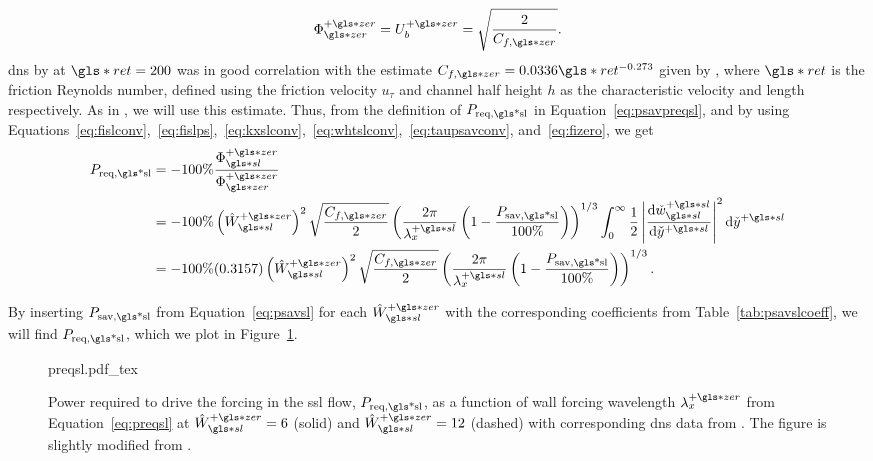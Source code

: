 \begin{equation}
	\Phi\pz\zz=U_b\pz=\sqrt{\frac{2}{C_{f,\gls*{zer}}}} \label{eq:fizero}
.\end{equation}
\gls*{dns} by \textcite{viotti2009} at $\gls*{ret}=200$ was in good correlation with the estimate $C_{f,\gls*{zer}}=0.0336 \gls*{ret}^{-0.273}$ given by \cite{pope2001}, where $\gls*{ret}$ is the friction Reynolds number, defined using the friction velocity $u_\tau$ and channel half height  $h$ as the characteristic velocity and length respectively. As in \cite{viotti2009,chernyshenko2013}, we will use this estimate.
Thus, from the definition of $P_\text{req,\gls*{sl}} $ in Equation~\eqref{eq:psavpreqsl}, and by using Equations~\eqref{eq:fislconv},~\eqref{eq:fislps},~\eqref{eq:kxslconv},~\eqref{eq:whtslconv},~\eqref{eq:taupsavconv}, and~\eqref{eq:fizero}, we get
\begin{align}
	P_\text{req,\gls*{sl}}&=-100\%\frac{\Phi \pz\ssl}{\Phi \pz\zz}\\
			      &=-100\%\left( \hat{W}\ssl\pz \right)^2 \sqrt{\frac{C_{f,\gls*{zer}}}{2}} \left( \frac{2\pi}{\lambda_x\ps}\left( 1-\frac{P_\text{sav,\gls*{sl}} }{100\%} \right)  \right) ^{1 /3}  \int_{0}^{\infty}\frac{1}{2} \left| \dv{\check{w}\ssl\ps}{\check{y}\ps}  \right| ^2 \dd{\check{y}\ps}\\
			      &=-100\%(0.3157)\left( \hat{W}\ssl\pz \right)^2 \sqrt{\frac{C_{f,\gls*{zer}}}{2}} \left( \frac{2\pi}{\lambda_x\ps}\left( 1-\frac{P_\text{sav,\gls*{sl}} }{100\%} \right)  \right) ^{1 /3}\label{eq:preqsl}
.\end{align}

By inserting $P_\text{sav,\gls*{sl}} $ from Equation~\eqref{eq:psavsl} for each $\hat{W}\ssl\pz$ with the corresponding coefficients from Table~\ref{tab:psavslcoeff}, we will find $P_\text{req,\gls*{sl}} $, which we plot  in Figure~\ref{fig:preqsl}.

\begin{figure}[htbp]
	\centering
	\def\svgwidth{0.7\textwidth}
	{preqsl.pdf_tex}
	\caption[$P_\text{req,\gls*{sl}} $ as a function of wall forcing wavelength $\lambda_x\pz$]{Power required to drive the forcing in the  \gls*{ssl} flow, $P_\text{req,\gls*{sl}} $, as a function of wall forcing wavelength $\lambda_x\pz$ from Equation~\eqref{eq:preqsl} at $\hat{W}\pz\ssl=6$ (solid) and $\hat{W}\pz\ssl=12$ (dashed) with corresponding \gls*{dns} data from \textcite{viotti2009}. The figure is slightly modified from \cite{chernyshenko2013}.} 
	\label{fig:preqsl}
\end{figure}

